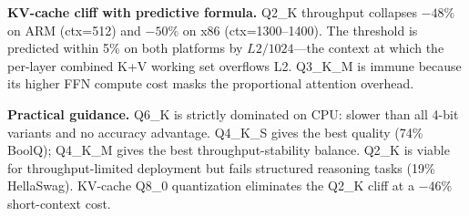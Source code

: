 \documentclass[conference]{IEEEtran}
\begin{document}
\textbf{KV-cache cliff with predictive formula.}
Q2\_K throughput collapses $-48\%$ on ARM (ctx=512) and $-50\%$ on x86
(ctx=1300--1400).
The threshold is predicted within 5\% on both platforms by $L2/1024$---the
context at which the per-layer combined K+V working set overflows L2.
Q3\_K\_M is immune because its higher FFN compute cost masks the proportional
attention overhead.

\textbf{Practical guidance.}
Q6\_K is strictly dominated on CPU: slower than all 4-bit variants and no
accuracy advantage.
Q4\_K\_S gives the best quality (74\% BoolQ); Q4\_K\_M gives the best
throughput-stability balance.
Q2\_K is viable for throughput-limited deployment but fails structured
reasoning tasks (19\% HellaSwag).
KV-cache Q8\_0 quantization eliminates the Q2\_K cliff at a $-46\%$ short-context cost.

\end{document}
